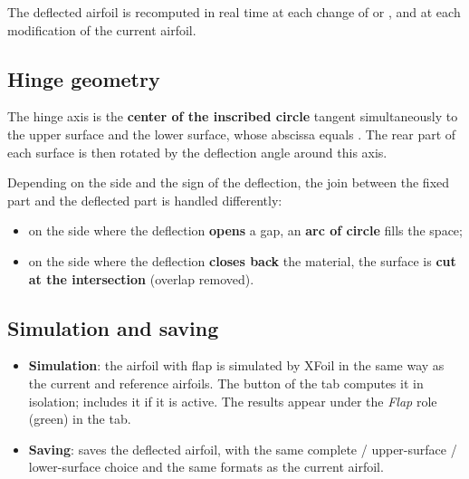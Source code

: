 The deflected airfoil is recomputed in real time at each change of
 or , and at each modification of the
current airfoil.

\subsection{Hinge geometry}

The hinge axis is the \textbf{center of the inscribed circle}
tangent simultaneously to the upper surface and the lower surface,
whose abscissa equals . The rear part of each surface is
then rotated by the deflection angle around this axis.


Depending on the side and the sign of the deflection, the join
between the fixed part and the deflected part is handled
differently:

\begin{itemize}
    \item on the side where the deflection \textbf{opens} a gap, an
        \textbf{arc of circle} fills the space;
    \item on the side where the deflection \textbf{closes back} the
        material, the surface is \textbf{cut at the intersection}
        (overlap removed).
\end{itemize}

\subsection{Simulation and saving}

\begin{itemize}
    \item \textbf{Simulation}: the airfoil with flap is simulated by
        XFoil in the same way as the current and reference airfoils.
        The  button of the 
        tab computes it in isolation;  includes it if
        it is active. The results appear under the \emph{Flap} role
        (green) in the  tab.
    \item \textbf{Saving}:  saves the deflected airfoil,
        with the same complete / upper-surface / lower-surface choice
        and the same formats as the current airfoil.
\end{itemize}

